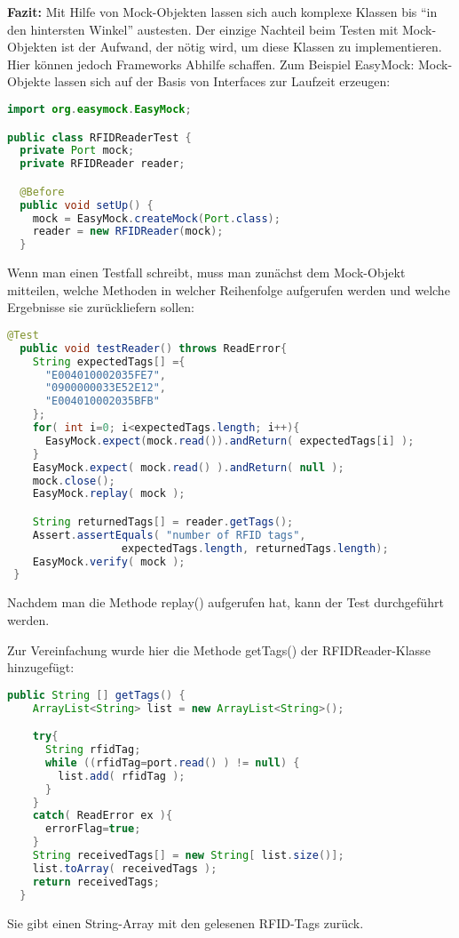 {\bfseries Fazit:} Mit Hilfe von Mock-Objekten lassen sich auch komplexe
Klassen bis ``in den hintersten Winkel'' austesten.
Der einzige Nachteil beim Testen mit Mock-Objekten ist der Aufwand,
der nötig wird, um diese Klassen zu implementieren. Hier können
jedoch Frameworks Abhilfe schaffen.
\newslide
Zum Beispiel EasyMock:
Mock-Objekte lassen sich auf der Basis von Interfaces zur Laufzeit
erzeugen:
\begin{lstlisting}[language=java]
import org.easymock.EasyMock;

public class RFIDReaderTest {
  private Port mock;
  private RFIDReader reader;

  @Before
  public void setUp() {
    mock = EasyMock.createMock(Port.class);
    reader = new RFIDReader(mock);
  }
\end{lstlisting}
\newslide
Wenn man einen Testfall schreibt, muss man zunächst dem Mock-Objekt mitteilen,
welche Methoden in welcher Reihenfolge aufgerufen werden
und welche Ergebnisse sie zurückliefern sollen:
\begin{lstlisting}[language=java]
  @Test
  public void testReader() throws ReadError{
    String expectedTags[] ={
      "E004010002035FE7",
      "0900000033E52E12",
      "E004010002035BFB"
    };
    for( int i=0; i<expectedTags.length; i++){
      EasyMock.expect(mock.read()).andReturn( expectedTags[i] );
    }
    EasyMock.expect( mock.read() ).andReturn( null );
    mock.close();
    EasyMock.replay( mock );

    String returnedTags[] = reader.getTags();
    Assert.assertEquals( "number of RFID tags",
                  expectedTags.length, returnedTags.length);
    EasyMock.verify( mock );
 }
\end{lstlisting}
Nachdem man die Methode replay() aufgerufen hat, kann der Test
durchgeführt werden.

\newslide
Zur Vereinfachung wurde hier die Methode getTags()
der RFIDReader-Klasse hinzugefügt:
\begin{lstlisting}[language=java]
  public String [] getTags() {
    ArrayList<String> list = new ArrayList<String>();

    try{
      String rfidTag;
      while ((rfidTag=port.read() ) != null) {
        list.add( rfidTag );
      }
    }
    catch( ReadError ex ){
      errorFlag=true;
    }
    String receivedTags[] = new String[ list.size()];
    list.toArray( receivedTags );
    return receivedTags;
  }
\end{lstlisting}
Sie gibt einen String-Array mit den gelesenen RFID-Tags zurück.
\newslide
